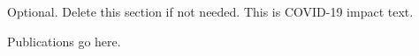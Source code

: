   \renewcommand*{\bibfont}{\large}






\begin{uomcovid} %
  Optional. Delete this section if not needed. This is COVID-19 impact text.
  
  \lipsum[1-3] %
\end{uomcovid}%




\makeatletter
\title{\xmp@Title}
\author{\xmp@Author}
\makeatother

\maketitle




\uomtoc %
\uomlof %
\uomlot %
\begin{uomlop} %
  Publications go here.
\end{uomlop}

